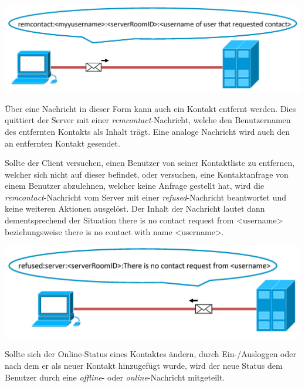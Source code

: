 \documentclass[12pt,a4paper,bibliography=totocnumbered,listof=totocnumbered]{scrartcl}
\begin{document}
\vspace{1em}
\begin{minipage}{\linewidth}
	\centering
	\includegraphics[width=0.7\linewidth]{img/remcontact1.png}
	\label{fig:remcontact1}
\end{minipage}
\vspace{0.5em} 

Über eine Nachricht in dieser Form kann auch ein Kontakt entfernt werden. Dies quittiert der Server mit einer \textit{remcontact}-Nachricht, welche den Benutzernamen des entfernten Kontakts als Inhalt trägt. Eine analoge Nachricht wird auch den an entfernten Kontakt gesendet.

Sollte der Client versuchen, einen Benutzer von seiner Kontaktliste zu entfernen, welcher sich nicht auf dieser befindet, oder versuchen, eine Kontaktanfrage von einem Benutzer abzulehnen, welcher keine Anfrage gestellt hat, wird die \textit{remcontact}-Nachricht vom Server mit einer \textit{refused}-Nachricht beantwortet und keine weiteren Aktionen ausgelöst. Der Inhalt der Nachricht lautet dann dementsprechend der Situation \glqq there is no contact request from \grq\textless{}username\textgreater\grq \grqq{} beziehungsweise \glqq there is no contact with name \grq\textless{}username\textgreater\grq \grqq{}.

\vspace{1em}
\begin{minipage}{\linewidth}
	\centering
	\includegraphics[width=0.7\linewidth]{img/remcontact2.png}
	\label{fig:remcontact2}
\end{minipage}
\vspace{0.5em}

Sollte sich der Online-Status eines Kontaktes ändern, durch Ein-/Ausloggen oder nach dem er als neuer Kontakt hinzugefügt wurde, wird der neue Status dem Benutzer durch eine \textit{offline}- oder \textit{online}-Nachricht mitgeteilt.
\end{document}
